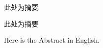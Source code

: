 

\begin{cabstract}
此处为摘要

此处为摘要
\end{cabstract}

\begin{eabstract}
Here is the Abstract in English.
\end{eabstract}